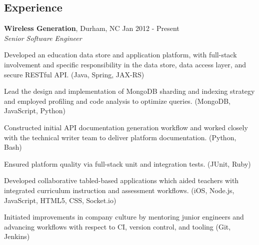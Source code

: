 \documentclass[margin,line]{resume}
\begin{document}
\begin{resume}

  \section{\mysidestyle \textcolor{mySideColor}{Experience}}

  \textbf{Wireless Generation}, Durham, NC \hfill Jan 2012 - Present\vspace{1mm}\\
  \textsl{Senior Software Engineer}\\
  \vspace{-3mm}
  \begin{list2}
\item Developed an education data store and application platform, with full-stack
  involvement and specific responsibility in the data store, data access layer,
  and secure RESTful API. (Java, Spring, JAX-RS)
\item Lead the design and implementation of MongoDB sharding and indexing strategy
  and employed profiling and code analysis to optimize queries. (MongoDB,
  JavaScript, Python)
\item Constructed initial API documentation generation workflow and worked closely
  with the technical writer team to deliver platform documentation. (Python,
  Bash)
\item Ensured platform quality via full-stack unit and integration tests. (JUnit,
  Ruby)
\item Developed collaborative tabled-based applications which aided teachers
  with integrated curriculum instruction and assessment workflows. (iOS,
  Node.js, JavaScript, HTML5, CSS, Socket.io)
\item Initiated improvements in company culture by mentoring junior engineers and
  advancing workflows with respect to CI, version control, and tooling (Git,
  Jenkins)
  \end{list2}


\end{resume}
\end{document}
